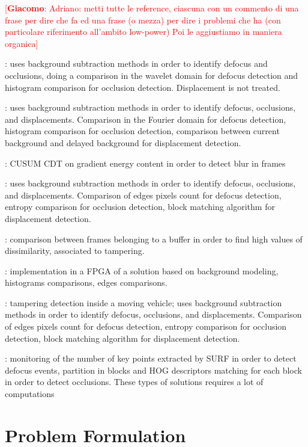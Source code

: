 \documentclass{llncs}
\newcommand{\gi}[1]{{\textcolor{red}{[\small \textbf{Giacomo}: #1]}}}
\begin{document}
\gi{Adriano: metti tutte le reference, ciascuna con un commento di una frase per dire che fa ed una frase (o mezza) per dire i problemi che ha (con particolare riferimento all'ambito low-power) Poi le aggiustiamo in maniera organica}

\cite{aksay2007camera}: uses background subtraction methods in order to identify defocus and occlusions, doing a comparison in the wavelet domain for defocus detection and histogram comparison  for occlusion detection. Displacement is not treated.

\cite{saglam2009real}:  uses background subtraction methods in order to identify defocus, occlusions, and displacements. Comparison in the Fourier domain for defocus detection, histogram comparison for occlusion detection, comparison between current background and delayed background for displacement detection.

\cite{alippi2010detecting}: CUSUM CDT on gradient energy content in order to detect blur in frames 

\cite{gil2007automatic}:  uses background subtraction methods in order to identify defocus, occlusions, and displacements. Comparison of edges pixels count for defocus detection, entropy comparison for occlusion detection, block matching algorithm for displacement detection.

\cite{ribnick2006real}: comparison between frames belonging to a buffer in order to find high values of dissimilarity, associated to tampering.

\cite{kryjak2012fpga}: implementation in a FPGA of a solution based on background modeling, histograms comparisons, edges comparisons.

\cite{harasse2004automated}: tampering detection inside a moving vehicle; uses background subtraction methods in order to identify defocus, occlusions, and displacements. Comparison of edges pixels count for defocus detection, entropy comparison for occlusion detection, block matching algorithm for displacement detection.

\cite{tsesmelis2013tamper}: monitoring of the number of key points extracted by SURF in order to detect defocus events, partition in blocks and HOG descriptors matching for each block in order to detect occlusions. These types of solutions requires a lot of computations

\section{Problem Formulation}\label{sec:probForm}
\end{document}

